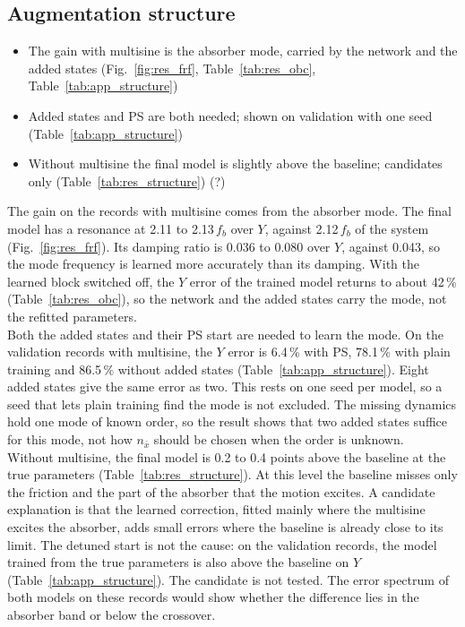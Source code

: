 \subsection{Augmentation structure}
\ifdraft
\begin{itemize}
\item The gain with multisine is the absorber mode, carried by the network and the added states (Fig.~\ref{fig:res_frf}, Table~\ref{tab:res_obc}, Table~\ref{tab:app_structure})
\item Added states and PS are both needed; shown on validation with one seed (Table~\ref{tab:app_structure})
\item Without multisine the final model is slightly above the baseline; candidates only (Table~\ref{tab:res_structure}) (?)
\end{itemize}
\fi
The gain on the records with multisine comes from the absorber mode.
The final model has a resonance at 2.11 to 2.13\,$f_b$ over $Y$, against
2.12\,$f_b$ of the system (Fig.~\ref{fig:res_frf}).
Its damping ratio is 0.036 to 0.080 over $Y$, against 0.043, so the mode
frequency is learned more accurately than its damping.
With the learned block switched off, the $Y$ error of the trained model
returns to about 42\,\% (Table~\ref{tab:res_obc}), so the network and the
added states carry the mode, not the refitted parameters.
\\
Both the added states and their PS start are needed to learn the mode.
On the validation records with multisine, the $Y$ error is 6.4\,\% with PS,
78.1\,\% with plain training and 86.5\,\% without added states
(Table~\ref{tab:app_structure}).
Eight added states give the same error as two.
This rests on one seed per model, so a seed that lets plain training find
the mode is not excluded.
The missing dynamics hold one mode of known order, so the result shows that
two added states suffice for this mode, not how $n_{\bar x}$ should be
chosen when the order is unknown.
\\
Without multisine, the final model is 0.2 to 0.4 points above the baseline
at the true parameters (Table~\ref{tab:res_structure}).
At this level the baseline misses only the friction and the part of the
absorber that the motion excites.
A candidate explanation is that the learned correction, fitted mainly where
the multisine excites the absorber, adds small errors where the baseline is
already close to its limit.
The detuned start is not the cause: on the validation records, the model
trained from the true parameters is also above the baseline on $Y$
(Table~\ref{tab:app_structure}).
The candidate is not tested.
The error spectrum of both models on these records would show whether the
difference lies in the absorber band or below the crossover.

